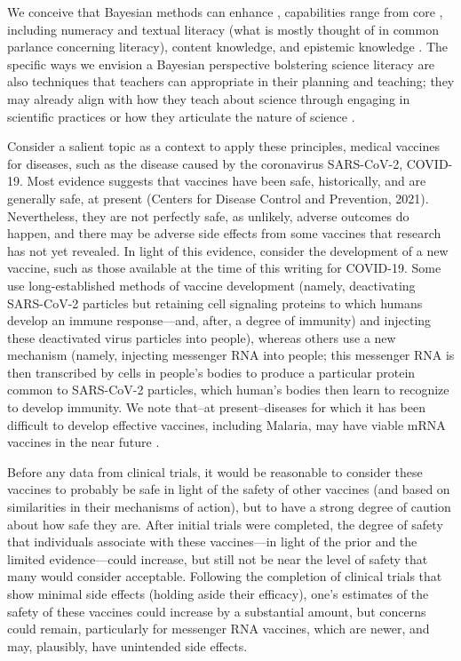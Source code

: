 \documentclass[man]{apa7}
\begin{document}
We conceive that Bayesian methods can enhance , capabilities range from core , including numeracy and textual literacy (what is mostly thought of in common parlance concerning literacy), content knowledge, and epistemic knowledge \parencite{council2016science}. The specific ways we envision a Bayesian perspective bolstering science literacy are also techniques that teachers can appropriate in their planning and teaching; they may already align with how they teach about science through engaging in scientific practices \parencite{nrc12} or how they articulate the nature of science \parencite{lederman2020avoiding}.

Consider a salient topic as a context to apply these principles, medical vaccines for diseases, such as the disease caused by the coronavirus SARS-CoV-2, COVID-19. Most evidence suggests that vaccines have been safe, historically, and are generally safe, at present (Centers for Disease Control and Prevention, 2021). Nevertheless, they are not perfectly safe, as unlikely, adverse outcomes do happen, and there may be adverse side effects from some vaccines that research has not yet revealed. In light of this evidence, consider the development of a new vaccine, such as those available at the time of this writing for COVID-19. Some use long-established methods of vaccine development (namely, deactivating SARS-CoV-2 particles but retaining cell signaling proteins to which humans develop an immune response—and, after, a degree of immunity) and injecting these deactivated virus particles into people), whereas others use a new mechanism (namely, injecting messenger RNA into people; this messenger RNA is then transcribed by cells in people’s bodies to produce a particular protein common to SARS-CoV-2 particles, which human’s bodies then learn to recognize to develop immunity. We note that--at present--diseases for which it has been difficult to develop effective vaccines, including Malaria, may have viable mRNA vaccines in the near future \parencite{datoo2021high}.

Before any data from clinical trials, it would be reasonable to consider these vaccines to probably be safe in light of the safety of other vaccines (and based on similarities in their mechanisms of action), but to have a strong degree of caution about how safe they are. After initial trials were completed, the degree of safety that individuals associate with these vaccines—in light of the prior and the limited evidence—could increase, but still not be near the level of safety that many would consider acceptable. Following the completion of clinical trials that show minimal side effects (holding aside their efficacy), one’s estimates of the safety of these vaccines could increase by a substantial amount, but concerns could remain, particularly for messenger RNA vaccines, which are newer, and may, plausibly, have unintended side effects.
\end{document}
